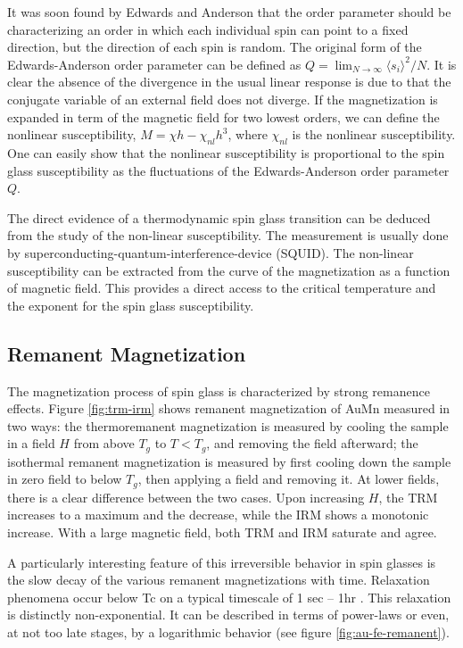 It was soon found by Edwards and Anderson that the order parameter should be 
characterizing an order in which each individual spin can point to a fixed 
direction, but the direction of each spin is random. The original form of the 
Edwards-Anderson order parameter can be defined as 
$Q=\lim_{N \rightarrow \infty} \langle s_{i}\rangle^{2} / N$. 
It is clear the absence 
of the divergence in the usual linear response is due to that the conjugate 
variable of an external field does not diverge. If the magnetization is expanded 
in term of the magnetic field for two lowest orders, we can define
the nonlinear susceptibility, $M=\chi h - \chi_{nl} h^{3}$, where $\chi_{nl}$ is 
the nonlinear susceptibility. 
One can easily show that the nonlinear susceptibility is proportional to the 
spin glass susceptibility as the fluctuations of the Edwards-Anderson order 
parameter $Q$. 

The direct evidence of a thermodynamic spin glass transition can be deduced from 
the study of the non-linear susceptibility. The measurement is usually done by 
superconducting-quantum-interference-device (SQUID). The non-linear susceptibility 
can be extracted from the curve of the magnetization as a function of magnetic field.
This provides a direct access to the critical temperature and the exponent for the 
spin glass susceptibility. 


\subsection{Remanent Magnetization}
The magnetization process of spin glass is characterized by strong remanence effects.
Figure \ref{fig:trm-irm} shows remanent magnetization of AuMn measured in two ways:
the thermoremanent magnetization is measured by cooling the sample in a field $H$ 
from above $T_g$ to $T<T_g$, and removing the field afterward; the isothermal 
remanent magnetization is measured by first cooling down the sample in zero field to
below $T_g$, then applying a field and removing it. At lower fields, there is a 
clear difference between the two cases. Upon increasing $H$, the TRM increases to 
a maximum and the decrease, while the IRM shows a monotonic increase. With a large
magnetic field, both TRM and IRM saturate and agree. 


A particularly interesting feature of this irreversible behavior in spin glasses 
is the slow decay of the various remanent magnetizations with time. 
Relaxation phenomena occur below Tc on a typical timescale of 1 sec -- 1hr
\cite{tholence:jpa-00215633,Holtzberg1977,NIEUWENHUYS1977880}. This relaxation is distinctly non-exponential. It can be 
described in terms of power-laws\cite{NIEUWENHUYS1977880} or even, at not too late stages, by a 
logarithmic behavior\cite{Holtzberg1977} (see figure \ref{fig:au-fe-remanent}).

